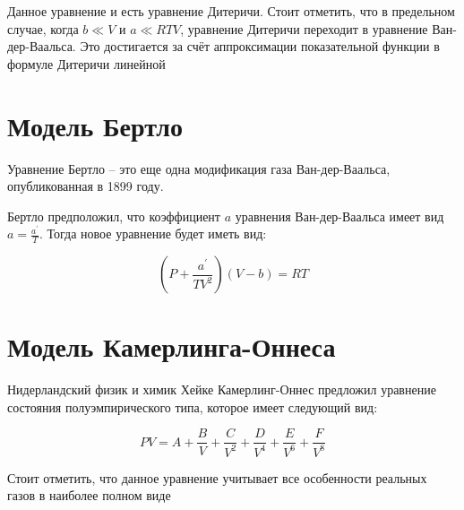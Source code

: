 \documentclass[a4paper, 14pt]{article}
\begin{document}
    Данное уравнение и есть уравнение Дитеричи.
    Стоит отметить, что в предельном случае, когда $b \ll V$ и $a \ll RTV$, уравнение Дитеричи переходит в уравнение
    Ван-дер-Ваальса.
    Это достигается за счёт аппроксимации показательной функции в формуле Дитеричи линейной

    \section*{Модель Бертло} 
    Уравнение Бертло -- это еще одна модификация газа Ван-дер-Ваальса, опубликованная в 1899 году.

    Бертло предположил, что коэффициент $a$ уравнения Ван-дер-Ваальса имеет вид $a = \frac{a^{\prime}}{T}$.
    Тогда новое уравнение будет иметь вид:

    \begin{equation}
        \label{eq:Berthelot}
        \left(P + \frac{a^{\prime}}{TV^{2}} \right)(V-b) = RT
    \end{equation}

%
%
%

    \section*{Модель Камерлинга-Оннеса} 

    Нидерландский физик и химик Хейке Камерлинг-Оннес предложил уравнение состояния полуэмпирического типа, которое
    имеет следующий вид:

    \[ PV = A + \frac{B}{V} + \frac{C}{V^2} + \frac{D}{V^4} + \frac{E}{V^6} + \frac{F}{V^8} \]

    Стоит отметить, что данное уравнение учитывает все особенности реальных газов в наиболее полном виде
\end{document}
